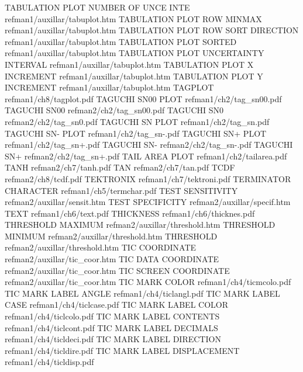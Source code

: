 TABULATION PLOT NUMBER OF UNCE INTE     refman1/auxillar/tabuplot.htm
TABULATION PLOT ROW MINMAX              refman1/auxillar/tabuplot.htm
TABULATION PLOT ROW SORT DIRECTION      refman1/auxillar/tabuplot.htm
TABULATION PLOT SORTED                  refman1/auxillar/tabuplot.htm
TABULATION PLOT UNCERTAINTY INTERVAL    refman1/auxillar/tabuplot.htm
TABULATION PLOT X INCREMENT             refman1/auxillar/tabuplot.htm
TABULATION PLOT Y INCREMENT             refman1/auxillar/tabuplot.htm
TAGPLOT                                 refman1/ch8/tagplot.pdf
TAGUCHI SN00 PLOT                       refman1/ch2/tag_sn00.pdf
TAGUCHI SN00                            refman2/ch2/tag_sn00.pdf
TAGUCHI SN0                             refman2/ch2/tag_sn0.pdf
TAGUCHI SN PLOT                         refman1/ch2/tag_sn.pdf
TAGUCHI SN- PLOT                        refman1/ch2/tag_sn-.pdf
TAGUCHI SN+ PLOT                        refman1/ch2/tag_sn+.pdf
TAGUCHI SN-                             refman2/ch2/tag_sn-.pdf
TAGUCHI SN+                             refman2/ch2/tag_sn+.pdf
TAIL AREA PLOT                          refman1/ch2/tailarea.pdf
TANH                                    refman2/ch7/tanh.pdf
TAN                                     refman2/ch7/tan.pdf
TCDF                                    refman2/ch8/tcdf.pdf
TEKTRONIX                               refman1/ch7/tektroni.pdf
TERMINATOR CHARACTER                    refman1/ch5/termchar.pdf
TEST SENSITIVITY                        refman2/auxillar/sensit.htm
TEST SPECIFICITY                        refman2/auxillar/specif.htm
TEXT                                    refman1/ch6/text.pdf
THICKNESS                               refman1/ch6/thicknes.pdf
THRESHOLD MAXIMUM                       refman2/auxillar/threshold.htm
THRESHOLD MINIMUM                       refman2/auxillar/threshold.htm
THRESHOLD                               refman2/auxillar/threshold.htm
TIC COORDINATE                          refman2/auxillar/tic_coor.htm
TIC DATA COORDINATE                     refman2/auxillar/tic_coor.htm
TIC SCREEN COORDINATE                   refman2/auxillar/tic_coor.htm
TIC MARK COLOR                          refman1/ch4/ticmcolo.pdf
TIC MARK LABEL ANGLE                    refman1/ch4/ticlangl.pdf
TIC MARK LABEL CASE                     refman1/ch4/ticlcase.pdf
TIC MARK LABEL COLOR                    refman1/ch4/ticlcolo.pdf
TIC MARK LABEL CONTENTS                 refman1/ch4/ticlcont.pdf
TIC MARK LABEL DECIMALS                 refman1/ch4/ticldeci.pdf
TIC MARK LABEL DIRECTION                refman1/ch4/ticldire.pdf
TIC MARK LABEL DISPLACEMENT             refman1/ch4/ticldisp.pdf
